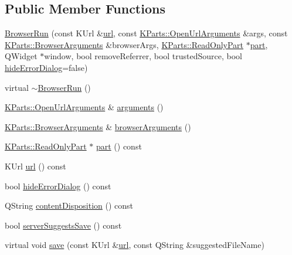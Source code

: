 \subsection*{Public Member Functions}
\begin{DoxyCompactItemize}
\item 
\hyperlink{classKParts_1_1BrowserRun_a48308a3cd53da552fb60a86400d06228}{Browser\+Run} (const K\+Url \&\hyperlink{classKParts_1_1BrowserRun_ad3f7d10647ab8b5a77399f46df92046b}{url}, const \hyperlink{classKParts_1_1OpenUrlArguments}{K\+Parts\+::\+Open\+Url\+Arguments} \&args, const \hyperlink{structKParts_1_1BrowserArguments}{K\+Parts\+::\+Browser\+Arguments} \&browser\+Args, \hyperlink{classKParts_1_1ReadOnlyPart}{K\+Parts\+::\+Read\+Only\+Part} $\ast$\hyperlink{classKParts_1_1BrowserRun_a65886b4004c00ddcc08b976f1042d0dc}{part}, Q\+Widget $\ast$window, bool remove\+Referrer, bool trusted\+Source, bool \hyperlink{classKParts_1_1BrowserRun_a1caa242a8389d61d6758e25a68f9df50}{hide\+Error\+Dialog}=false)
\item 
virtual \hyperlink{classKParts_1_1BrowserRun_aa141423e9096f956970d4fe92e581814}{$\sim$\+Browser\+Run} ()
\item 
\hyperlink{classKParts_1_1OpenUrlArguments}{K\+Parts\+::\+Open\+Url\+Arguments} \& \hyperlink{classKParts_1_1BrowserRun_a5843399feb9cafe9a2f62b258c2f5a31}{arguments} ()
\item 
\hyperlink{structKParts_1_1BrowserArguments}{K\+Parts\+::\+Browser\+Arguments} \& \hyperlink{classKParts_1_1BrowserRun_a7fb44c1871cf67132853d8bb59dfe006}{browser\+Arguments} ()
\item 
\hyperlink{classKParts_1_1ReadOnlyPart}{K\+Parts\+::\+Read\+Only\+Part} $\ast$ \hyperlink{classKParts_1_1BrowserRun_a65886b4004c00ddcc08b976f1042d0dc}{part} () const 
\item 
K\+Url \hyperlink{classKParts_1_1BrowserRun_ad3f7d10647ab8b5a77399f46df92046b}{url} () const 
\item 
bool \hyperlink{classKParts_1_1BrowserRun_a1caa242a8389d61d6758e25a68f9df50}{hide\+Error\+Dialog} () const 
\item 
Q\+String \hyperlink{classKParts_1_1BrowserRun_aa0ffe2da032f4e14eb6c7ba5f0d9996f}{content\+Disposition} () const 
\item 
bool \hyperlink{classKParts_1_1BrowserRun_a7daa3c6e44b8a37aa9c1d010972194dc}{server\+Suggests\+Save} () const 
\item 
virtual void \hyperlink{classKParts_1_1BrowserRun_acff594a6127fe8f5f19364e1da47eccf}{save} (const K\+Url \&\hyperlink{classKParts_1_1BrowserRun_ad3f7d10647ab8b5a77399f46df92046b}{url}, const Q\+String \&suggested\+File\+Name)
\end{DoxyCompactItemize}

